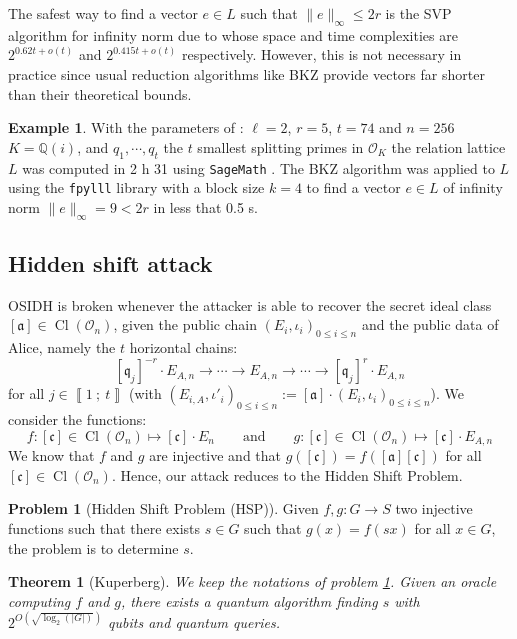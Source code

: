 \documentclass[a4paper,10pt]{report}
\theoremstyle{definition}
\theoremstyle{plain}
\newtheorem{theorem}[definition]{Theorem}
\theoremstyle{definition}
\newtheorem{example}[definition]{Example}
\newtheorem{problem}[definition]{Problem}
\newcommand{\Q}{\mathbb{Q}}
\newcommand{\mO}{\mathcal{O}}
\renewcommand{\i}[2]{\left\llbracket #1~;~#2\right\rrbracket}
\renewcommand{\(}{\left(}
\renewcommand{\)}{\right)}
\newcommand{\mf}[1]{\mathfrak{#1}}
\DeclareMathOperator{\Cl}{Cl}
\begin{document}
The safest way to find a vector $e\in L$ such that $\|e\|_\infty\leq 2r$ is the SVP algorithm for infinity norm due to \cite{Aggarwal2018} whose space and time complexities are $2^{0.62t+o(t)}$ and $2^{0.415t+o(t)}$ respectively. However, this is not necessary in practice since usual reduction algorithms like BKZ provide vectors far shorter than their theoretical bounds.

\begin{example}
With the parameters of \cite[p. 28]{OSIDH}: $\ell=2$, $r=5$, $t=74$ and $n=256$ $K=\Q(i)$,  and $q_1,\cdots, q_t$ the $t$ smallest splitting primes in $\mO_K$ the relation lattice $L$ was computed in 2 h 31 using \verb?SageMath? \cite{sagemath}. The BKZ algorithm was applied to $L$ using the \verb?fpylll? library \cite{fpylll} with a block size $k=4$ to find a vector $e\in L$ of infinity norm $\|e\|_\infty=9<2r$ in less that 0.5 s.
\end{example}

\subsection{Hidden shift attack}

OSIDH is broken whenever the attacker is able to recover the secret ideal class $[\mf{a}]\in\Cl(\mO_n)$, given the public chain $(E_i,\iota_i)_{0\leq i\leq n}$ and the public data of Alice, namely the $t$ horizontal chains:
\[[\mf{q}_j]^{-r}\cdot E_{A,n}\longrightarrow \cdots \longrightarrow E_{A,n} \longrightarrow \cdots \longrightarrow [\mf{q}_j]^{r}\cdot E_{A,n}\]
for all $j\in\i{1}{t}$ (with $(E_{i,A},\iota'_i)_{0\leq i\leq n}:=[\mf{a}]\cdot (E_i,\iota_i)_{0\leq i\leq n}$). We consider the functions:
\[f: [\mf{c}]\in\Cl(\mO_n)\longmapsto [\mf{c}]\cdot E_n \qquad \mbox{and} \qquad g: [\mf{c}]\in\Cl(\mO_n)\longmapsto [\mf{c}]\cdot E_{A,n}\]
We know that $f$ and $g$ are injective and that $g([\mf{c}])=f([\mf{a}][\mf{c}])$ for all $[\mf{c}]\in\Cl(\mO_n)$. Hence, our attack reduces to the Hidden Shift Problem.

\begin{problem}[Hidden Shift Problem (HSP)]\label{problem 4}
Given $f,g: G\longrightarrow S$ two injective functions such that there exists $s\in G$ such that $g(x)=f(sx)$ for all $x\in G$, the problem is to determine $s$.
\end{problem}

\begin{theorem}[Kuperberg]
We keep the notations of problem \ref{problem 4}. Given an oracle computing $f$ and $g$, there exists a quantum algorithm finding $s$ with $2^{O(\sqrt{\log_2(|G|)})}$ qubits and quantum queries.
\end{theorem}
\end{document}
